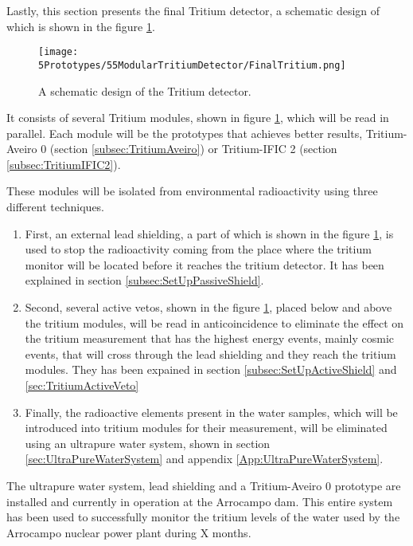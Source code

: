 Lastly, this section presents the final Tritium detector, a schematic design of which is shown in the figure \ref{fig:TritiumDetectorSchematicDesign}.

\begin{figure}[h]
\centering
\texttt{[image: 5Prototypes/55ModularTritiumDetector/FinalTritium.png]}
\caption{A schematic design of the Tritium detector.\label{fig:TritiumDetectorSchematicDesign}}
\end{figure}

It consists of several Tritium modules, shown in figure \ref{fig:TritiumDetectorSchematicDesign}, which will be read in parallel. Each module will be the prototypes that achieves better results, Tritium-Aveiro 0 (section \ref{subsec:TritiumAveiro}) or Tritium-IFIC 2 (section \ref{subsec:TritiumIFIC2}).

These modules will be isolated from environmental radioactivity using three different techniques.

\begin{enumerate}

\item{} First, an external lead shielding, a part of which is shown in the figure \ref{fig:TritiumDetectorSchematicDesign}, is used to stop the radioactivity coming from the place where the tritium monitor will be located before it reaches the tritium detector. It has been explained in section \ref{subsec:SetUpPassiveShield}. 

\item{} Second, several active vetos, shown in the figure \ref{fig:TritiumDetectorSchematicDesign}, placed below and above the tritium modules, will be read in anticoincidence to eliminate the effect on the tritium measurement that has the highest energy events, mainly cosmic events, that will cross through the lead shielding and they reach the tritium modules. They has been expained in section \ref{subsec:SetUpActiveShield} and \ref{sec:TritiumActiveVeto}

\item{} Finally, the radioactive elements present in the water samples, which will be introduced into tritium modules for their measurement, will be eliminated using an ultrapure water system, shown in section \ref{sec:UltraPureWaterSystem} and appendix \ref{App:UltraPureWaterSystem}.

\end{enumerate}

The ultrapure water system, lead shielding and a Tritium-Aveiro 0 prototype are installed and currently in operation at the Arrocampo dam. This entire system has been used to successfully monitor the tritium levels of the water used by the Arrocampo nuclear power plant during X months.

